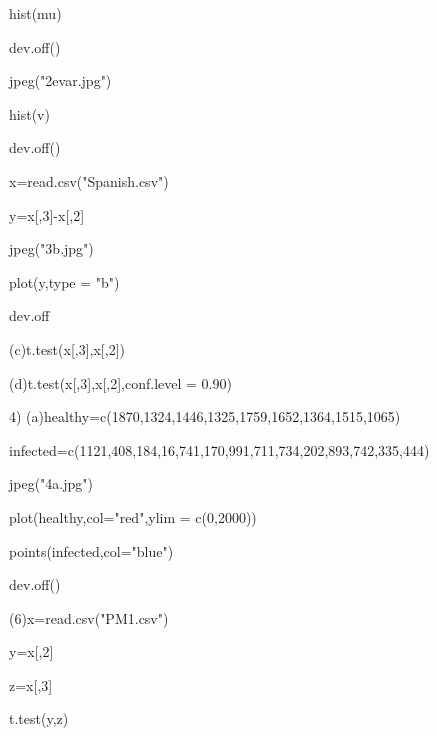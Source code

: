 \documentclass{article}
\begin{document}
hist(mu)

dev.off()

jpeg("2evar.jpg")

hist(v)

dev.off()

x=read.csv("Spanish.csv")

y=x[,3]-x[,2]

jpeg("3b.jpg")

plot(y,type = "b")

dev.off

(c)t.test(x[,3],x[,2])

(d)t.test(x[,3],x[,2],conf.level = 0.90)

4)
(a)healthy=c(1870,1324,1446,1325,1759,1652,1364,1515,1065)

infected=c(1121,408,184,16,741,170,991,711,734,202,893,742,335,444)

jpeg("4a.jpg")

plot(healthy,col="red",ylim = c(0,2000))

points(infected,col="blue")

dev.off()

(6)x=read.csv("PM1.csv")

y=x[,2]

z=x[,3]

t.test(y,z)
\end{document}
